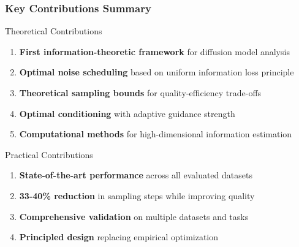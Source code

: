 \documentclass[aspectratio=169]{beamer}
\begin{document}
\begin{frame}
\frametitle{Key Contributions Summary}
\begin{block}{Theoretical Contributions}
\begin{enumerate}
\item \textbf{First information-theoretic framework} for diffusion model analysis
\item \textbf{Optimal noise scheduling} based on uniform information loss principle
\item \textbf{Theoretical sampling bounds} for quality-efficiency trade-offs
\item \textbf{Optimal conditioning} with adaptive guidance strength
\item \textbf{Computational methods} for high-dimensional information estimation
\end{enumerate}
\end{block}

\begin{block}{Practical Contributions}
\begin{enumerate}
\item \textbf{State-of-the-art performance} across all evaluated datasets
\item \textbf{33-40\% reduction} in sampling steps while improving quality
\item \textbf{Comprehensive validation} on multiple datasets and tasks
\item \textbf{Principled design} replacing empirical optimization
\end{enumerate}
\end{block}
\end{frame}
\end{document}
